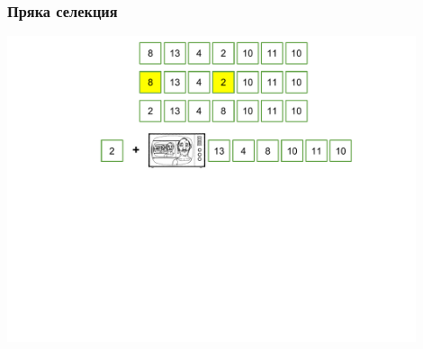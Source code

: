 \documentclass{beamer}
\begin{document}
\begin{frame}[fragile]
\frametitle{Пряка селекция}

\begin{center}
   \includegraphics[width=12cm]{images/ssort_rec}
\end{center}

\end{frame}
\end{document}
